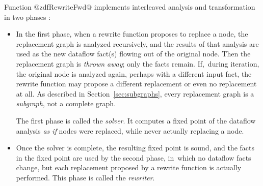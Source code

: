 \documentclass[blockstyle,preprint,natbib,nocopyrightspace]{sigplanconf}
\newcommand{\authornote}[1]{{\em #1}}
\def\authornote#1{\unskip\relax}
\newcommand{\simon}[1]{\authornote{SLPJ: #1}}
\newcommand\secref[1]{Section~\ref{sec:#1}}
\newcommand\seclabel[1]{\label{sec:#1}}
\begin{document}
Function
@zdfRewriteFwd@ implements
interleaved analysis and transformation
in two phases \citep{lerner-grove-chambers:2002}:\seclabel{solver-phase}
\begin{itemize}
\item
In the first phase, when a rewrite function proposes to replace a
node, the replacement graph is analyzed recursively, and the results
of that analysis are used as the new dataflow
fact(s) flowing out of the original node.
Then the replacement
graph is \emph{thrown away}; only the facts remain.
If,~during iteration, the original node is analyzed again, perhaps
with a different input fact, the rewrite function may propose
a different replacement or even no replacement at all.
As described in \secref{subgraphs}, every replacement graph is a
\emph{subgraph}, not a complete graph.

The first phase is called the \emph{solver}.
It computes a fixed point of the dataflow analysis
\emph{as if} nodes were replaced, while never actually replacing a node.
\item
Once the solver is complete, the resulting fixed point is sound,
and the facts in the fixed point are used by the second phase, in~which
no dataflow facts change, but
each replacement proposed by a rewrite function is actually
performed.
This phase is called the \emph{rewriter}.
\end{itemize}
\end{document}
